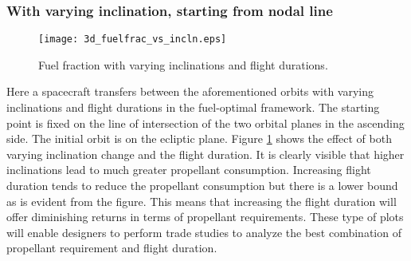 \subsubsection{With varying inclination, starting from nodal line}
\begin{figure}[h]
	\centering\texttt{[image: 3d\_fuelfrac\_vs\_incln.eps]}
	\caption{Fuel fraction with varying inclinations and flight durations.}
	\label{3d_varyincln}
\end{figure}
Here a spacecraft transfers between the aforementioned orbits with varying inclinations and flight durations in the fuel-optimal framework. The starting point is fixed on the line of intersection of the two orbital planes in the ascending side. The initial orbit is on the ecliptic plane. Figure \ref{3d_varyincln} shows the effect of both varying inclination change and the flight duration. It is clearly visible that higher inclinations lead to much greater propellant consumption. Increasing flight duration tends to reduce the propellant consumption but there is a lower bound as is evident from the figure. This means that increasing the flight duration will offer diminishing returns in terms of propellant requirements. These type of plots will enable designers to perform trade studies to analyze the best combination of propellant requirement and flight duration.
